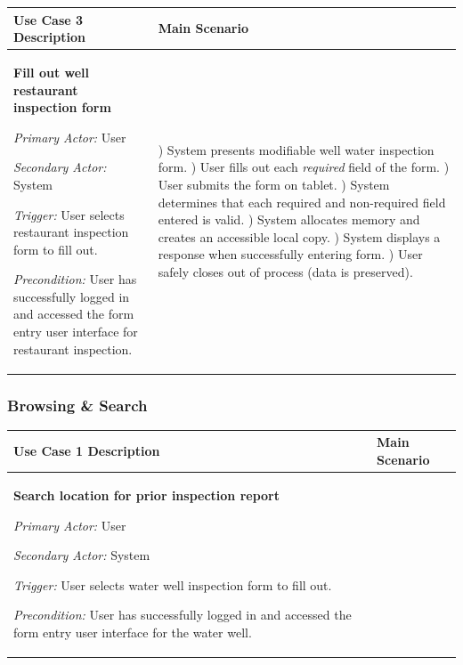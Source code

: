 \documentclass[twoside,letterpaper]{article}
\begin{document}
\begin{flushleft}
\tablehead{}
\begin{supertabular}{|m{3.17056in}|m{3.5in}|}
\hline


\bfseries\color{black} Use Case 3 Description &
Main Scenario
\\\hline
{\bfseries\color{black} Fill out well restaurant inspection form}

{\color{black} \textit{Primary Actor:} User}

{\color{black} \textit{Secondary Actor:} System}

{\color{black} \textit{Trigger:} User selects restaurant inspection form to fill out.}

{\color{black} \textit{Precondition:} User has successfully logged in and accessed the form entry user interface for restaurant inspection.}
~
 &
) System presents modifiable well water inspection form.
) User fills out each \textit{required} field of the form.
) User submits the form on tablet.
) System determines that each required and non-required field entered is valid.
) System allocates memory and creates an accessible local copy.
) System displays a response when successfully entering form.
) User safely closes out of process (data is preserved).\\\hline
\end{supertabular}
\end{flushleft}
\subsubsection{Browsing \& Search}
\begin{flushleft}
\tablehead{}
\begin{supertabular}{|m{3.17056in}|m{3.5in}|}
\hline

\bfseries\color{black} Use Case 1 Description &
Main Scenario
\\\hline
{\bfseries\color{black} Search location for prior inspection report}

{\color{black} \textit{Primary Actor:} User}

{\color{black} \textit{Secondary Actor:} System}

{\color{black} \textit{Trigger:} User selects water well inspection form to fill out.}

{\color{black} \textit{Precondition:} User has successfully logged in and accessed the form entry user interface for the water well.}
~
 &

\\\hline
\end{supertabular}
\end{flushleft}
\end{document}
